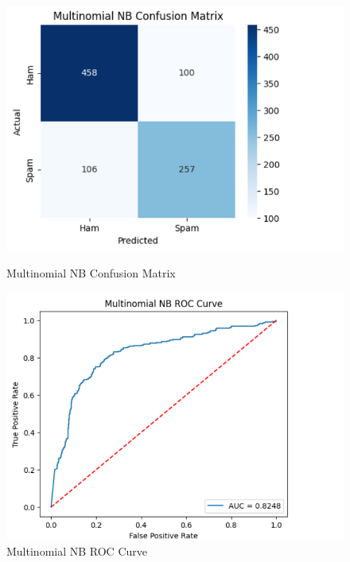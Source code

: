 \documentclass[12pt]{article}
\begin{document}
\begin{figure}[H]
\centering
\begin{minipage}{0.45\textwidth}
\centering
\includegraphics[width=\linewidth]{8.png}
\caption{Multinomial NB Confusion Matrix}
\end{minipage}
\hfill
\begin{minipage}{0.45\textwidth}
\centering
\includegraphics[width=\linewidth]{9.png}
\caption{Multinomial NB ROC Curve}
\end{minipage}
\end{figure}
\end{document}
